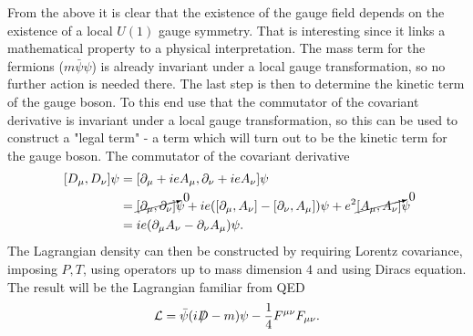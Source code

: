 From the above it is clear that the existence of the gauge field depends on the existence of a local $U(1)$ gauge symmetry. That is interesting since it links a mathematical property to a physical interpretation. The mass term for the fermions ($m\bar{\psi}\psi$) is already invariant under a local gauge transformation, so no further action is needed there. The last step is then to determine the kinetic term of the gauge boson. To this end use that the commutator of the covariant derivative is invariant under a local gauge transformation, so this can be used to construct a "legal term" - a term which will turn out to be the kinetic term for the gauge boson. The commutator of the covariant derivative
\begin{equation}
	\begin{split}
		[D_\mu,D_\nu]\psi&=[\partial_\mu+ieA_\mu,\partial_\nu+ieA_\nu]\psi\\
		&=\cancelto{0}{[\partial_\mu,\partial_\nu]}\psi+ie([\partial_\mu,A_\nu]-[\partial_\nu,A_\mu])\psi+e^2\cancelto{0}{[A_\mu,A_\nu]}\psi\\
		&=ie(\partial_\mu A_\nu-\partial_\nu A_\mu)\psi.\\
	\end{split}
\end{equation}  
The Lagrangian density can then be constructed by requiring Lorentz covariance, imposing $P,T$, using operators up to mass dimension $4$ and using Diracs equation. The result will be the Lagrangian familiar from QED
\begin{equation}
	\mathcal{L}=\bar{\psi}(i\slashed D-m)\psi-\frac{1}{4}F^{\mu\nu}F_{\mu\nu}.
\end{equation} 

